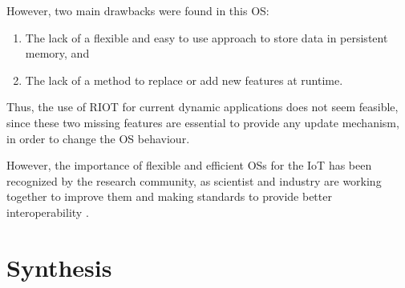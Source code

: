 However, two main drawbacks were found in this OS:
\begin{enumerate}
	\item The lack of a flexible and easy to use approach to store data in persistent memory, and
	\item The lack of a method to replace or add new features at runtime.
\end{enumerate}

Thus, the use of RIOT for current dynamic applications does not seem feasible, since these two missing features are essential to provide any update mechanism, in order to change the OS behaviour.

However, the importance of flexible and efficient OSs for the IoT has been recognized by the research community, as scientist and industry are working together to improve them and making standards to provide better interoperability \cite{hahm2015OSIOT}.







\section{Synthesis}

